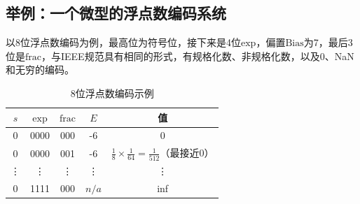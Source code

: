 \documentclass[a4paper, 12pt, UTF8]{ctexart}
\begin{document}
\subsection{举例：一个微型的浮点数编码系统}
以8位浮点数编码为例，最高位为符号位，接下来是4位\(\text{exp}\)，偏置\(\text{Bias}\)为7，最后3位是\(\text{frac}\)，与IEEE规范具有相同的形式，有规格化数、非规格化数，以及0、NaN和无穷的编码。
\begin{table}[h]
    \centering
    \begin{tabular}{|c|c|c|c|c|}
        \hline
        \(s\)  & \(\text{exp}\) & \(\text{frac}\) & \(E\)   & 值                                                     \\
        \hline
        0      & 0000           & 000             & -6      & 0                                                     \\
        0      & 0000           & 001             & -6      & \(\frac{1}{8}\times\frac{1}{64}=\frac{1}{512}\)（最接近0） \\
        \vdots & \vdots         & \vdots          & \vdots  & \vdots                                                \\
        0      & 1111           & 000             & \(n/a\) & inf                                                   \\
        \hline
    \end{tabular}
    \caption{8位浮点数编码示例}
\end{table}
\end{document}
